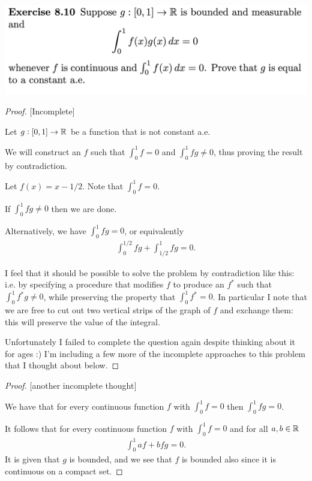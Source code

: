 \begin{mdframed}
\includegraphics[width=400pt]{img/analysis--berkeley-202a-hw09-113a.png}
\end{mdframed}

\begin{proof}

  [Incomplete]

  Let $g: [0, 1] \to \mathbb{R}$ be a function that is not constant a.e.

  We will construct an $f$ such that $\int_0^1 f = 0$ and $\int_0^1 fg \neq 0$, thus proving the result by
  contradiction.

  Let $f(x) = x - 1/2$. Note that $\int_0^1 f = 0$.

  If $\int_0^1 fg \neq 0$ then we are done.

  Alternatively, we have $\int_0^1 fg = 0$, or equivalently
  \begin{align*}
    \int_0^{1/2} fg + \int_{1/2}^1 fg = 0.
  \end{align*}

  I feel that it should be possible to solve the problem by contradiction like this: i.e. by specifying a
  procedure that modifies $f$ to produce an $f^*$ such that $\int_0^1 f^*g \neq 0$, while preserving the property that $\int_0^1 f^* = 0$. In particular I note that we
  are free to cut out two vertical strips of the graph of $f$ and exchange them: this will preserve the value
  of the integral.

  Unfortunately I failed to complete the question again despite thinking about it for ages :) I'm including a
  few more of the incomplete approaches to this problem that I thought about below.
\end{proof}


\begin{proof}

  [another incomplete thought]

  We have that for every continuous function $f$ with $\int_0^1 f = 0$ then $\int_0^1 fg = 0$.

  It follows that for every continuous function $f$ with $\int_0^1 f = 0$ and for all $a, b \in \mathbb{R}$
  \begin{align*}
    \int_0^1 af + bfg = 0.
  \end{align*}
  It is given that $g$ is bounded, and we see that $f$ is bounded also since it is continuous on a compact set.

\end{proof}


